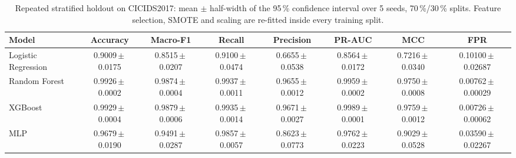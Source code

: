 \begin{table}[htbp]
\centering
\caption{Repeated stratified holdout on CICIDS2017: mean $\pm$ half-width of the 95\,\% confidence interval over 5 seeds, 70\,\%/30\,\% splits. Feature selection, SMOTE and scaling are re-fitted inside every training split.}
\label{tab:holdout}
\scriptsize
\begin{tabular}{lccccccc}
\hline
Model & Accuracy & Macro-F1 & Recall & Precision & PR-AUC & MCC & FPR \\
\hline
Logistic Regression & 0.9009\,$\pm$\,0.0175 & 0.8515\,$\pm$\,0.0207 & 0.9100\,$\pm$\,0.0474 & 0.6655\,$\pm$\,0.0538 & 0.8564\,$\pm$\,0.0172 & 0.7216\,$\pm$\,0.0340 & 0.10100\,$\pm$\,0.02687 \\
Random Forest & 0.9926\,$\pm$\,0.0002 & 0.9874\,$\pm$\,0.0004 & 0.9937\,$\pm$\,0.0011 & 0.9655\,$\pm$\,0.0012 & 0.9959\,$\pm$\,0.0002 & 0.9750\,$\pm$\,0.0008 & 0.00762\,$\pm$\,0.00029 \\
XGBoost & 0.9929\,$\pm$\,0.0004 & 0.9879\,$\pm$\,0.0006 & 0.9935\,$\pm$\,0.0014 & 0.9671\,$\pm$\,0.0027 & 0.9989\,$\pm$\,0.0001 & 0.9759\,$\pm$\,0.0012 & 0.00726\,$\pm$\,0.00062 \\
MLP & 0.9679\,$\pm$\,0.0190 & 0.9491\,$\pm$\,0.0287 & 0.9857\,$\pm$\,0.0057 & 0.8623\,$\pm$\,0.0773 & 0.9762\,$\pm$\,0.0223 & 0.9029\,$\pm$\,0.0528 & 0.03590\,$\pm$\,0.02267 \\
\hline
\end{tabular}
\end{table}
